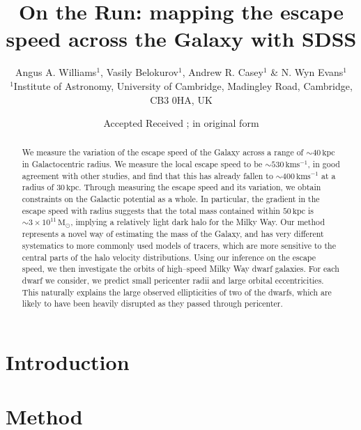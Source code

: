\documentclass[useAMS,twocolumn,usenatbib]{mn2e}
\title[Fast moving stars in SDSS] 
      {On the Run: mapping the escape speed across the Galaxy with SDSS}
\author[Williams, Belokurov, Casey \& Evans]{Angus A. Williams$^1$, Vasily Belokurov$^1$, Andrew R. Casey$^1$ \& N. Wyn Evans$^1$
  \medskip
  \\$^1$Institute of Astronomy, University of Cambridge, Madingley Road,
       Cambridge, CB3 0HA, UK}
\def\kpc{{\,\mathrm{kpc}}}
\def\kms{{\,\mathrm{kms^{-1}}}}
\def\Msun{{\,\mathrm{M}_\odot}}
\begin{document}
\date{Accepted  Received ; in original form }

\pagerange{\pageref{firstpage}--\pageref{lastpage}} 

\maketitle

\label{firstpage}

\begin{abstract}

We measure the variation of the escape speed of the Galaxy across a range of $\sim 40\kpc$ in 
Galactocentric radius. We measure the local escape speed to be $\sim 530\kms$, in good agreement 
with other studies, and find that this has already fallen to $\sim 400\kms$ at a radius 
of $30\kpc$. Through measuring the escape speed and its variation, we obtain constraints on the 
Galactic potential as a whole. In particular, the gradient in the escape speed with radius suggests 
that the total mass contained within $50\kpc$ is $\sim 3\times10^{11}\Msun$, implying a 
relatively light dark halo for the Milky Way. Our method represents a novel way of estimating the 
mass of the Galaxy, and has very different systematics to more commonly used models of tracers, which 
are more sensitive to the central parts of the halo velocity distributions. Using our inference on 
the escape speed, we then investigate the orbits of high--speed Milky Way dwarf galaxies. For each 
dwarf we consider, we predict small pericenter radii and large orbital eccentricities. This naturally 
explains the large observed ellipticities of two of the dwarfs, which are likely to have been 
heavily disrupted as they passed through pericenter.
 
\end{abstract}

\begin{keywords}

\end{keywords}

\section{Introduction}

\section{Method}

\end{document}
